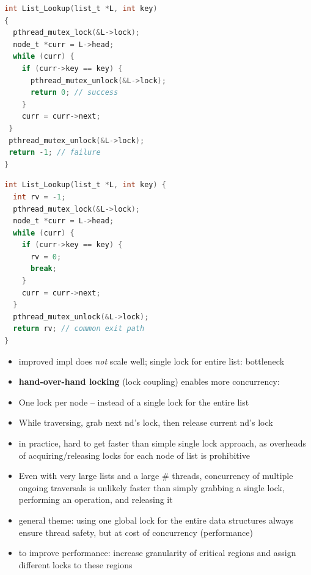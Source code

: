 \begin{minipage}{.53\linewidth}
\begin{lstlisting}[language=c,xleftmargin=-4pt]
int List_Lookup(list_t *L, int key)
{
  pthread_mutex_lock(&L->lock);
  node_t *curr = L->head;
  while (curr) {
    if (curr->key == key) {
      pthread_mutex_unlock(&L->lock);
      return 0; // success
    }
    curr = curr->next;
 }
 pthread_mutex_unlock(&L->lock);
 return -1; // failure
}
\end{lstlisting}
\end{minipage}
\begin{minipage}{.53\linewidth}
\begin{lstlisting}[language=c,xleftmargin=2pt]
int List_Lookup(list_t *L, int key) {
  int rv = -1;
  pthread_mutex_lock(&L->lock);
  node_t *curr = L->head;
  while (curr) {
    if (curr->key == key) {
      rv = 0;
      break;
    }
    curr = curr->next;
  }
  pthread_mutex_unlock(&L->lock);
  return rv; // common exit path
}
\end{lstlisting}
\end{minipage}
\begin{itemize}
\item improved impl does \emph{not} scale well; single lock for entire list: bottleneck
\item \textbf{hand-over-hand locking} (lock coupling) enables more concurrency:
\item One lock per node – instead of a single lock for the entire list
\item While traversing, grab next nd's lock, then release current nd's lock
\item in practice, hard to get faster than simple single lock approach, as overheads of acquiring/releasing locks for each node of list is prohibitive
\item Even with very large lists and a large \# threads, concurrency of multiple ongoing traversals is unlikely faster than simply grabbing a single lock, performing an operation, and releasing it
\item general theme: using one global lock for the entire data structures always ensure thread safety, but at cost of concurrency (performance)
\item to improve performance: increase granularity of critical regions and assign different locks to these regions
\end{itemize}
